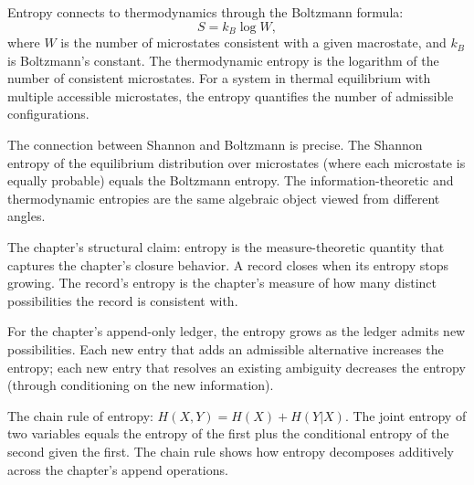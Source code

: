 Entropy connects to thermodynamics through the Boltzmann formula:
\[
S = k_B \log W,
\]
where $W$ is the number of microstates consistent with a given
macrostate, and $k_B$ is Boltzmann's constant. The thermodynamic
entropy is the logarithm of the number of consistent microstates.
For a system in thermal equilibrium with multiple accessible
microstates, the entropy quantifies the number of admissible
configurations.

The connection between Shannon and Boltzmann is precise. The
Shannon entropy of the equilibrium distribution over microstates
(where each microstate is equally probable) equals the Boltzmann
entropy. The information-theoretic and thermodynamic entropies
are the same algebraic object viewed from different angles.

The chapter's structural claim: entropy is the measure-theoretic
quantity that captures the chapter's closure behavior. A record
closes when its entropy stops growing. The record's entropy is
the chapter's measure of how many distinct possibilities the
record is consistent with.

For the chapter's append-only ledger, the entropy grows as the
ledger admits new possibilities. Each new entry that adds an
admissible alternative increases the entropy; each new entry
that resolves an existing ambiguity decreases the entropy
(through conditioning on the new information).

The chain rule of entropy: $H(X, Y) = H(X) + H(Y | X)$. The
joint entropy of two variables equals the entropy of the first
plus the conditional entropy of the second given the first. The
chain rule shows how entropy decomposes additively across the
chapter's append operations.

